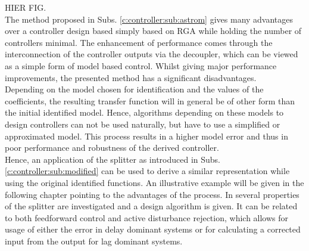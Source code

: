 HIER FIG.\\

The method proposed in Subs. \ref{c:controller:sub:astrom} gives many advantages over a controller design based simply based on RGA while holding the number of controllers minimal. The enhancement of performance comes through the interconnection of the controller outputs via the decoupler, which can be viewed as a simple form of model based control. Whilst giving major performance improvements, the presented method has a significant disadvantages.\\

Depending on the model chosen for identification and the values of the coefficients, the resulting transfer function will in general be of other form than the initial identified model. Hence, algorithms depending on these models to design controllers can not be used naturally, but have to use a simplified or approximated model. This process results in a higher model error and thus in poor performance and robustness of the derived controller.\\

Hence, an application of the splitter as introduced in Subs.\ref{c:controller:sub:modified} can be used to derive a similar representation while using the original identified functions. An illustrative example will be given in the following chapter pointing to the advantages of the process. In \cite{Wang2006} several properties of the splitter are investigated and a design algorithm is given. It can be related to both feedforward control and active disturbance rejection, which allows for usage of either the error in delay dominant systems or for calculating a corrected input from the output for lag dominant systems.

